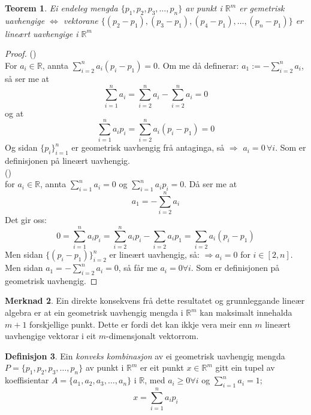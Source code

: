 \documentclass[a4paper, titlepage, 12pt, norsk]{article}
\theoremstyle{plain}
\newtheorem{theorem}{Teorem}[section]
\theoremstyle{definition}
\newtheorem{definition}[theorem]{Definisjon}
\newtheorem{remark}[theorem]{Merknad}
\newcommand{\R}{\mathbb{R}}
\begin{document}
\begin{theorem}\label{thm:geometrisklineærtuavhengig}
	Ei endeleg mengda $\{p_1, p_2, p_3, \dots, p_n \}$ av punkt i $\R^m$ er gemetrisk uavhengige $\Leftrightarrow$ vektorane $\{(p_2-p_1), (p_3-p_1), (p_4-p_1),\dots,(p_n-p_1)\}$ er lineært uavhengige i $\R^m$
\end{theorem}
\begin{proof}
	(\Rightarrow)
	\\For $a_i\in\R$, annta $\sum_{i=2}^na_i(p_i-p_1)=0$. Om me då definerar: $a_1 := -\sum_{i=2}^na_i$, så ser me at 
	\begin{equation*}
		\sum_{i=1}^na_i=\sum_{i=2}^na_i-\sum_{i=2}^na_i=0
	\end{equation*}
	og at 
	\begin{equation*}
		\sum_{i=1}^na_ip_i=\sum_{i=2}^na_i(p_i-p_1)=0
	\end{equation*}
	Og sidan $\{p_i\}_{i=1}^n$ er geometrisk uavhengig frå antaginga, så $\Rightarrow$ $a_i=0 \, \forall i$. Som er definisjonen på lineært uavhengig.
	\\(\Leftarrow)
	\\for $a_i\in\R$, annta $\sum_{i=1}^n a_i=0$ og $\sum_{i=1}^n a_ip_i=0$. Då ser me at 
	\begin{equation*}
		a_1=-\sum_{i=2}^n a_i
	\end{equation*} 
	Det gir oss: 
	\begin{equation*}
		0=\sum_{i=1}^n a_ip_i=\sum_{i=2}^n a_ip_i-\sum_{i=2}a_ip_1=\sum_{i=2}a_i(p_i-p_1)
	\end{equation*}
	Men sidan $\{(p_i-p_1)\}_{i=2}^n$ er lineært uavhengig, så: $\Rightarrow a_i = 0$ for $i\in[2,n]$. Men sidan $a_1 = -\sum_{i=2}^n a_i=0$, så får me $a_i=0 \forall i$. Som er definisjonen på geometrisk uavhengig.
\end{proof}
\begin{remark}
	Ein direkte konsekvens frå dette resultatet og grunnleggande lineær algebra er at ein geometrisk uavhengig mengda i $\R^m$ kan maksimalt innehalda $m+1$ forskjellige punkt. Dette er fordi det kan ikkje vera meir enn $m$ lineært uavhengige vektorar i eit $m$-dimensjonalt vektorrom.
\end{remark}
\begin{definition}
	Ein \emph{konveks kombinasjon} av ei geometrisk uavhengig mengda $P=\{p_1, p_2, p_3, \dots, p_n\}$ av punkt i $\R^m$ er eit punkt $x\in\R^m$ gitt ein tupel av koeffisientar $A=\{a_1, a_2, a_3, \dots, a_n\}$ i $\R$, med $a_i\geq0\forall i$ og $\sum_{i=1}^n a_i = 1;$
	\begin{equation*}
		x=\sum_{i=1}^n a_ip_i
	\end{equation*}
\end{definition}
\end{document}
